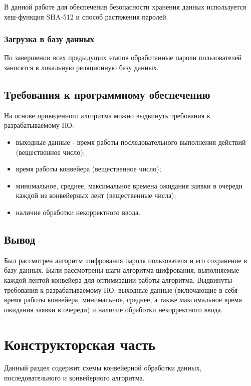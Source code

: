 \documentclass[a4paper,oneside,14pt]{extreport}
\begin{document}
В данной работе для обеспечения безопасности хранения данных используется хеш-функция SHA-512 и способ растяжения паролей.

\subsection{Загрузка в базу данных}
По завершении всех предыдущих этапов обработанные пароли пользователей заносятся в локальную реляционную базу данных.

\section{Требования к программному обеспечению}
На основе приведенного алгоритма можно выдвинуть требования к разрабатываемому ПО:
\begin{itemize}
   	\item выходные данные - время работы последовательного выполнения действий (вещественное число);
	\item время работы конвейера (вещественное число);
	\item минимальное, среднее, максимальное времена ожидания заявки в очереди каждой из конвейерных лент (вещественные числа);
	\item наличие обработки некорректного ввода.
\end{itemize}

\section{Вывод}
 Был рассмотрен алгоритм шифрования пароля пользователя и его сохранение в базу данных.
Были рассмотрены шаги алгоритма шифрования, выполняемые каждой лентой конвейера для оптимизации работы алгоритма.
Выдвинуты требования к разрабатываемому ПО: выходные данные (включающие в себя время работы конвейера, минимальное, среднее, а также максимальное время ожидания заявки в очереди) и наличие обработки некорректного ввода.

\newpage

\chapter{Конструкторская часть}
Данный раздел содержит схемы конвейерной обработки данных, последовательного и конвейерного алгоритма.
\end{document}
